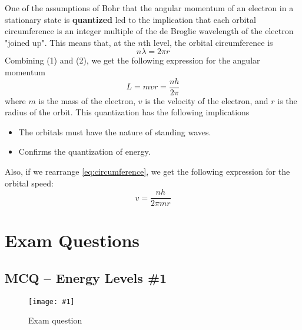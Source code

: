 \documentclass[a4paper,12pt]{article}
\let\oldsection\section
\renewcommand\section{\clearpage\oldsection}
\newcommand{\img}[4]{\begin{center}
  \begin{figure}[H]
    \centering
    \texttt{[image: \#1]}
    \caption{#3}
    \label{fig:#4}
  \end{figure}
\end{center}}
\begin{document}
One of the assumptions of Bohr that the angular momentum of an electron in a stationary state is \textbf{quantized} led to the implication that each orbital circumference is an integer multiple of the de Broglie wavelength of the electron "joined up". This means that, at the $n$th level, the orbital circumference is \begin{equation}\label{eq:circumference}
  n\lambda = 2\pi r
\end{equation}
Combining (1) and (2), we get the following expression for the angular momentum\begin{equation}
  L = mvr = \frac{nh}{2\pi}
\end{equation} where $m$ is the mass of the electron, $v$ is the velocity of the electron, and $r$ is the radius of the orbit.
This quantization has the following implications
\begin{itemize}
  \item The orbitals must have the nature of standing waves.
  \item Confirms the quantization of energy.
\end{itemize}
Also, if we rearrange \cref{eq:circumference}, we get the following expression for the orbital speed:
\begin{equation}
  v = \frac{nh}{2\pi mr}
\end{equation}

\section{Exam Questions}

\subsection{MCQ -- Energy Levels \#1}

\img{ex/1.png}{0.95}{Exam question}{ex1}
\end{document}
